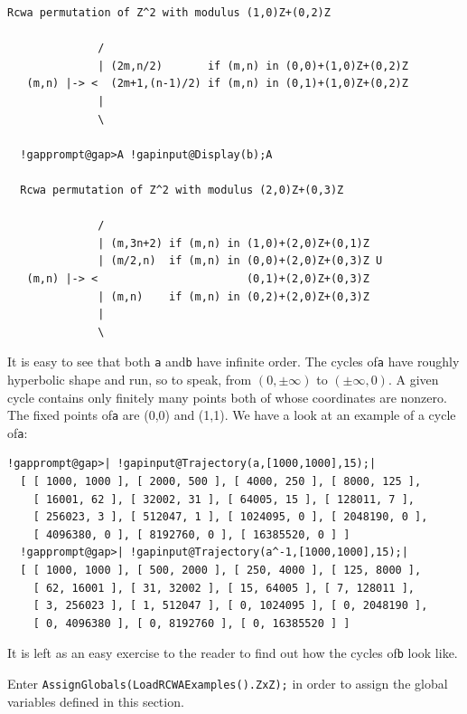 \documentclass[a4paper,11pt]{report}
\begin{document}
{{\begin{Verbatim}[commandchars=!@A,fontsize=\small,frame=single,label=Example]
  Rcwa permutation of Z^2 with modulus (1,0)Z+(0,2)Z
  
              /
              | (2m,n/2)       if (m,n) in (0,0)+(1,0)Z+(0,2)Z
   (m,n) |-> <  (2m+1,(n-1)/2) if (m,n) in (0,1)+(1,0)Z+(0,2)Z
              |
              \
  
  !gapprompt@gap>A !gapinput@Display(b);A
  
  Rcwa permutation of Z^2 with modulus (2,0)Z+(0,3)Z
  
              /
              | (m,3n+2) if (m,n) in (1,0)+(2,0)Z+(0,1)Z
              | (m/2,n)  if (m,n) in (0,0)+(2,0)Z+(0,3)Z U 
   (m,n) |-> <                       (0,1)+(2,0)Z+(0,3)Z
              | (m,n)    if (m,n) in (0,2)+(2,0)Z+(0,3)Z
              |
              \
\end{Verbatim}
 It is easy to see that both \texttt{a} and{\nobreakspace}\texttt{b} have infinite order. The cycles of{\nobreakspace}\texttt{a} have roughly hyperbolic shape and run, so to speak, from $(0,\pm \infty)$ to $(\pm \infty,0)$. A given cycle contains only finitely many points both of whose coordinates
are nonzero. The fixed points of{\nobreakspace}\texttt{a} are (0,0) and (\texttt{\symbol{45}}1,\texttt{\symbol{45}}1). We have a look at
an example of a cycle of{\nobreakspace}\texttt{a}: 
\begin{Verbatim}[commandchars=!@|,fontsize=\small,frame=single,label=Example]
  !gapprompt@gap>| !gapinput@Trajectory(a,[1000,1000],15);|
  [ [ 1000, 1000 ], [ 2000, 500 ], [ 4000, 250 ], [ 8000, 125 ], 
    [ 16001, 62 ], [ 32002, 31 ], [ 64005, 15 ], [ 128011, 7 ], 
    [ 256023, 3 ], [ 512047, 1 ], [ 1024095, 0 ], [ 2048190, 0 ], 
    [ 4096380, 0 ], [ 8192760, 0 ], [ 16385520, 0 ] ]
  !gapprompt@gap>| !gapinput@Trajectory(a^-1,[1000,1000],15);|
  [ [ 1000, 1000 ], [ 500, 2000 ], [ 250, 4000 ], [ 125, 8000 ], 
    [ 62, 16001 ], [ 31, 32002 ], [ 15, 64005 ], [ 7, 128011 ], 
    [ 3, 256023 ], [ 1, 512047 ], [ 0, 1024095 ], [ 0, 2048190 ], 
    [ 0, 4096380 ], [ 0, 8192760 ], [ 0, 16385520 ] ]
\end{Verbatim}
 It is left as an easy exercise to the reader to find out how the cycles
of{\nobreakspace}\texttt{b} look like. 

 Enter \texttt{AssignGlobals(LoadRCWAExamples().ZxZ);} in order to assign the global variables defined in this section. }

  
}
\end{document}
